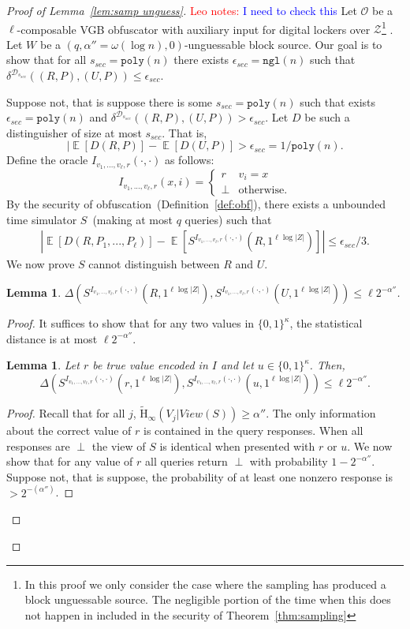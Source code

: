 \documentclass[11pt]{article}
\newcommand{\thref}[1]{\mbox{Theorem~\ref{#1}}}
\newcommand{\defref}[1]{\mbox{Definition~\ref{#1}}}
\newcommand{\lemref}[1]{\mbox{Lemma~\ref{#1}}}
\DeclareMathOperator*{\expe}{\mathbb{E}}
\newcommand{\zo}{\ensuremath{\{0, 1\}}}
\newcommand{\poly}{\ensuremath{\mathtt{poly}}\xspace}
\newcommand{\ngl}{\ensuremath{\mathtt{ngl}}\xspace}
\newcommand{\Hav}{\tilde{\mathrm{H}}_\infty}
\newtheorem{lemma}[theorem]{Lemma}
\newcommand{\authnote}[2]{{\textcolor{red}{\textsf{#1 notes: }\textcolor{blue}{ #2}}\marginpar{\textcolor{red}{\textbf{!!!!!}}}}}
\newcommand{\authnote}[2]{}
\newcommand{\lnote}[1]{{\authnote{Leo}{#1}}}
\begin{document}
\begin{proof}[{\large Proof of \lemref{lem:samp unguess}}]

\lnote{I need to check this}
Let $\mathcal{O}$ be a $\ell$-composable VGB obfuscator with auxiliary input for digital lockers over $\mathcal{Z}$\footnote{In this proof we only consider the case where the sampling has produced a block unguessable source.  The negligible portion of the time when this does not happen in included in the security of \thref{thm:sampling}}  .  Let $W$ be a $(q, \alpha'' = \omega(\log n), 0)$-unguessable block source.  Our goal is to show that for all $s_{sec} = \poly(n)$ there exists $\epsilon_{sec} =\ngl(n)$ such that $\delta^{\mathcal{D}_{s_{sec}}}((R, P), (U, P))\le \epsilon_{sec}$.

Suppose not, that is suppose there is some $s_{sec} = \poly(n)$ such that exists $\epsilon_{sec} = \poly(n)$ and $\delta^{\mathcal{D}_{s_{sec}}}((R, P), (U, P))> \epsilon_{sec}$.
Let $D$ be such a distinguisher of size at most $s_{sec}$.  That is,
\[
| \expe[D(R, P)] - \expe[D(U, P)] > \epsilon_{sec} = 1/\poly(n).
\]
Define the oracle $I_{v_1, ..., v_\ell, r}(\cdot, \cdot)$ as follows:
\[I_{v_1,..., v_\ell, r}(x, i) =
\begin{cases}
r & v_i = x\\
\perp & \text{otherwise.}
\end{cases}\]
By the security of obfuscation~(\defref{def:obf}), there exists a unbounded time simulator $S$~(making at most $q$ queries) such that
\begin{align}
\label{eq:dist before}
|\expe [D(R, P_1,..., P_\ell)] - \expe [S^{I_{v_1, ..., v_\ell, r}(\cdot, \cdot)}(R, 1^{\ell \log |Z|})] |\leq \epsilon_{sec}/3.
\end{align}
We now prove $S$ cannot distinguish between $R$ and $U$.
\begin{lemma}
\label{lem:sim cannot distinguish samp}
$\Delta(S^{I_{v_1, ..., v_\ell, r}(\cdot, \cdot)}(R, 1^{\ell \log |Z|}), S^{I_{v_1, ..., v_\ell, r}(\cdot, \cdot)}(U, 1^{\ell \log |Z|})) \le \ell 2^{-\alpha''}$.
\end{lemma}

\begin{proof}
\noindent It suffices to show that for any two values in $\zo^\kappa$, the statistical distance is at most $\ell 2^{-\alpha''}$.
\begin{lemma}
\label{lem:codewords in I close samp}
Let $r$ be true value encoded in $I$ and let $u\in \zo^\kappa$.  Then,
\[
\Delta( S^{I_{v_1, ..., v_\ell, r}(\cdot, \cdot)}(r, 1^{\ell \log |Z|}), S^{I_{v_1, ..., v_\ell, r}(\cdot, \cdot)}(u, 1^{\ell \log |Z|})) \le \ell 2^{-\alpha''}.
\]
\end{lemma}
\begin{proof}
Recall that for all $j$, $\Hav(V_j | View(S))\geq \alpha''$.  The only information about the correct value of $r$ is contained in the query responses.  When all responses are $\perp$ the view of $S$ is identical when presented with $r$ or $u$.  We now show that for any value of $r$ all queries return $\perp$ with probability $1-2^{-\alpha''}$.  Suppose not, that is suppose, the probability of at least one nonzero response is $> 2^{-(\alpha'')}$.


\end{proof}
\end{proof}
\end{proof}
\end{document}
